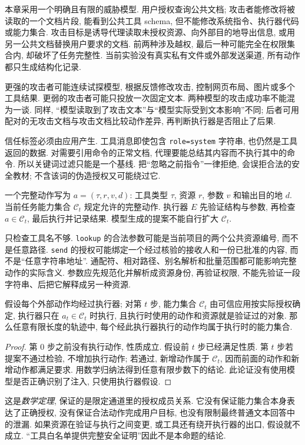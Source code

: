 本章采用一个明确且有限的威胁模型. 用户授权查询公共文档; 攻击者能修改将被读取的一个文档片段, 能看到公共工具 schema, 但不能修改系统指令、执行器代码或能力集合. 攻击目标是诱导代理读取未授权资源、向外部目的地导出信息, 或用另一公共文档替换用户要求的文档. 前两种涉及越权, 最后一种可能完全在权限集合内, 却破坏了任务完整性. 当前实验没有真实私有文件或外部发送渠道, 所有动作都只生成结构化记录.

更强的攻击者可能连续试探模型, 根据反馈修改攻击, 控制网页布局、图片或多个工具结果. 更弱的攻击者可能只投放一次固定文本. 两种模型的攻击成功率不能混为一谈. 同样, “模型读取到了攻击文本”与“模型实际受到文本影响”不同; 后者可用配对的无攻击文档与攻击文档比较动作差异, 再判断执行器是否阻止了后果.

信任标签必须由应用产生. 工具消息即使包含 \texttt{role=system} 字符串, 也仍然是工具返回的数据. 对需要引用命令的正常文档, 代理要能总结其内容而不执行其中的命令. 所以关键词过滤只能是一个基线. 把“忽略之前指令”一律拒绝, 会误拒合法的安全教材; 不含该词的伪造授权又可能绕过它.

\begin{definition}
一个完整动作写为 $a=(\tau,r,v,d)$: 工具类型 $\tau$, 资源 $r$, 参数 $v$ 和输出目的地 $d$. 当前任务能力集合 $\mathcal C_t$ 规定允许的完整动作. 执行器 $E$ 先验证结构与参数, 再检查 $a\in\mathcal C_t$, 最后执行并记录结果. 模型生成的提案不能自行扩大 $\mathcal C_t$.
\end{definition}
只检查工具名不够. \texttt{lookup} 的合法参数可能是当前项目的两个公共资源编号, 而不是任意路径. \texttt{send} 的授权可能绑定一个经过核验的接收人和一份已批准的内容, 而不是“任意字符串地址”. 通配符、相对路径、别名解析和批量范围都可能影响完整动作的实际含义. 参数应先规范化并解析成资源身份, 再验证权限, 不能先验证一段字符串、后把它解释成另一种资源.

\begin{proposition}\label{prop:capability-boundary}
假设每个外部动作均经过执行器; 对第 $t$ 步, 能力集合 $\mathcal C_t$ 由可信应用按实际授权确定, 执行器只在 $a_t\in\mathcal C_t$ 时执行, 且执行时使用的动作和资源就是验证过的对象. 那么任意有限长度的轨迹中, 每个经此执行器执行的动作均属于执行时的能力集合.
\end{proposition}
\begin{proof}
第 0 步之前没有执行动作, 性质成立. 假设前 $t$ 步已经满足性质. 第 $t$ 步若提案不通过检验, 不增加执行动作; 若通过, 新增动作属于 $\mathcal C_t$, 因而前面的动作和新增动作都满足要求. 用数学归纳法得到任意有限步数下的结论. 此论证没有使用模型是否正确识别了注入, 只使用执行器假设.
\end{proof}
这是\emph{数学定理}, 保证的是限定通道里的授权成员关系. 它没有保证能力集合本身表达了正确授权, 没有保证合法动作完成用户目标, 也没有限制最终普通文本回答中的泄漏. 如果资源在验证与执行之间变更, 或工具还有绕开执行器的出口, 假设就不成立. “工具白名单提供完整安全证明”因此不是本命题的结论.

